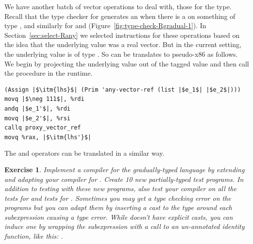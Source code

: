 \documentclass[11pt]{book}
\newtheorem{exercise}[theorem]{Exercise}
\begin{document}
We have another batch of vector operations to deal with, those for the
 type. Recall that the type checker for \LangGrad{} generates an
 when there is a  on something
of type , and similarly for   and
 (Figure~\ref{fig:type-check-Rgradual-1}). In
Section~\ref{sec:select-Rany} we selected instructions for these
operations based on the idea that the underlying value was a real
vector. But in the current setting, the underlying value is of type
. So  can be translates to
pseudo-x86 as follows. We begin by projecting the underlying value out
of the tagged value and then call the 
procedure in the runtime.
\begin{lstlisting}
(Assign |$\itm{lhs}$| (Prim 'any-vector-ref (list |$e_1$| |$e_2$|)))
movq |$\neg 111$|, %rdi
andq |$e_1'$|, %rdi
movq |$e_2'$|, %rsi
callq proxy_vector_ref
movq %rax, |$\itm{lhs'}$|
\end{lstlisting}
The  and  operators can
be translated in a similar way.

\begin{exercise}\normalfont
  Implement a compiler for the gradually-typed \LangGrad{} language by
  extending and adapting your compiler for \LangLoop{}. Create 10 new
  partially-typed test programs. In addition to testing with these
  new programs, also test your compiler on all the tests for \LangLoop{}
  and tests for \LangDyn{}. Sometimes you may get a type checking error
  on the \LangDyn{} programs but you can adapt them by inserting
  a cast to the  type around each subexpression
  causing a type error. While \LangDyn{} doesn't have explicit casts,
  you can induce one by wrapping the subexpression 
  with a call to an un-annotated identity function, like this:
  .
\end{exercise}
\end{document}
